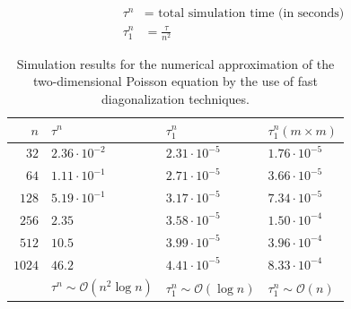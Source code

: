 \documentclass[11pt]{article}
\begin{document}
\begin{align*}
  \tau^n &= \text{ total simulation time (in seconds)} \\
  \tau_1^n &= \frac{\tau}{n^2} 
\end{align*}

\begin{table}[h]
  \begin{center}
    \begin{tabular}{|r|l|l|l|}
      \hline
      $n$ & $\tau^n$ & $\tau_1^n$ & $\tau_1^n (m \times m)$ \\
      \hline
      $32$ & $2.36 \cdot 10^{-2}$ & $2.31 \cdot 10^{-5}$ & $1.76 \cdot 10^{-5}$ \\
      $64$ & $1.11 \cdot 10^{-1}$ & $2.71 \cdot 10^{-5}$ & $3.66 \cdot 10^{-5}$ \\
      $128$ & $5.19 \cdot 10^{-1}$ & $3.17 \cdot 10^{-5}$ & $7.34 \cdot 10^{-5}$ \\
      $256$ & $2.35$ & $3.58 \cdot 10^{-5}$ & $1.50 \cdot 10^{-4}$ \\
      $512$ & $10.5$ & $3.99 \cdot 10^{-5}$ & $3.96 \cdot 10^{-4}$ \\
      $1024$ & $46.2$ & $4.41 \cdot 10^{-5}$ & $8.33 \cdot 10^{-4}$ \\
      \hline
      & $\tau^n \sim \mathcal{O}(n^2 \log n)$ & $\tau_1^n \sim \mathcal{O}(\log n)$ & $\tau_1^n \sim \mathcal{O}(n) $ \\
      \hline
    \end{tabular}
  \end{center}
  \caption{Simulation results for the numerical approximation of the two-dimensional Poisson equation by the use of fast diagonalization techniques.}
\end{table}
\end{document}
